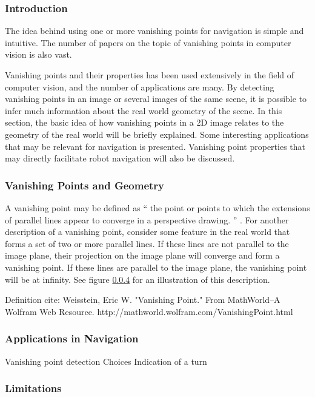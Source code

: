\subsubsection{Introduction}

The idea behind using one or more vanishing points for navigation is simple and intuitive.  The number of papers on the topic of vanishing points in computer vision is also vast.  

Vanishing points and their properties has been used extensively in the field of computer vision, and the number of applications are many. By detecting vanishing points in an image or several images of the same scene, it is possible to infer much information about the real world geometry of the scene. In this section, the basic idea of how vanishing points in a 2D image relates to the geometry of the real world will be briefly explained. Some interesting applications that may be relevant for navigation is presented. Vanishing point properties that may directly facilitate robot navigation will also be discussed.

\subsubsection{Vanishing Points and Geometry}

A vanishing point may be defined as `` the point or points to which the extensions of parallel lines appear to converge in a perspective drawing. '' \cite{}. For another description of a vanishing point, consider some feature in the real world that forms a set of two or more parallel lines. If these lines are not parallel to the image plane, their projection on the image plane will converge and form a vanishing point. If these lines are parallel to the image plane, the vanishing point will be at infinity. See figure \ref{} for an illustration of this description.

Definition cite:
Weisstein, Eric W. "Vanishing Point." From MathWorld--A Wolfram Web Resource. http://mathworld.wolfram.com/VanishingPoint.html 

\subsubsection{Applications in Navigation}

Vanishing point detection 
Choices
Indication of a turn

\subsubsection{Limitations}



